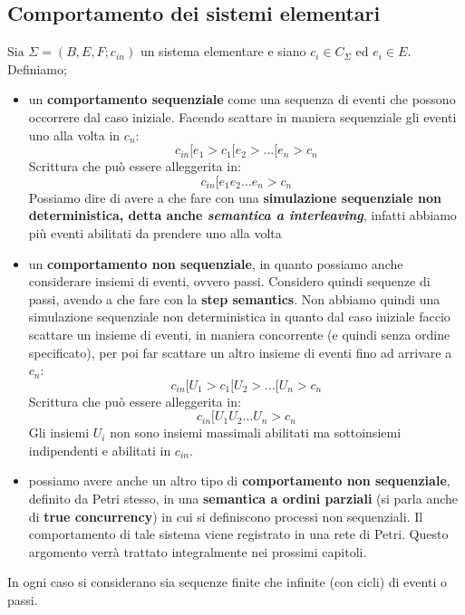 \subsection{Comportamento dei sistemi elementari}
\begin{definizione}
  Sia $\Sigma=(B, E, F;c_{in})$ un sistema elementare e siano $c_i\in C_\Sigma$ ed
  $e_i\in E$.\\
  Definiamo;
  \begin{itemize}
    \item un \textbf{comportamento sequenziale} come una sequenza di eventi che
    possono occorrere dal caso iniziale. Facendo scattare in maniera sequenziale
    gli eventi uno alla volta in $c_n$:
    \[c_{in} [e_1 > c_1 [e_2 > \ldots[e_n > c_n\]
    Scrittura che può essere alleggerita in:
    \[c_{in} [e_1 e_2 \ldots e_n > c_n\]
    Possiamo dire di avere a che fare con una \textbf{simulazione sequenziale
      non deterministica, detta anche \textit{semantica a interleaving}},
    infatti abbiamo più eventi abilitati da prendere uno alla volta
    \item un \textbf{comportamento non sequenziale}, in quanto possiamo anche
    considerare insiemi di eventi, ovvero passi. Considero quindi sequenze di
    passi, avendo a che fare con la \textbf{step semantics}. Non abbiamo quindi una
    simulazione sequenziale non deterministica in quanto dal caso iniziale
    faccio scattare un insieme di eventi, in maniera concorrente (e quindi senza
    ordine specificato), per poi far scattare un altro insieme di eventi fino ad
    arrivare a $c_n$: 
    \[c_{in} [U_1 > c_1 [U_2 > \ldots [U_n > c_n\]
    Scrittura che può essere alleggerita in:
    \[c_{in} [U_1 U_2 \ldots U_n > c_n\]
    Gli insiemi $U_i$ non sono insiemi massimali abilitati ma sottoinsiemi
    indipendenti e abilitati in $c_{in}$.\\
\item    possiamo avere anche un altro tipo di \textbf{comportamento non sequenziale},
    definito da Petri stesso, in una \textbf{semantica a ordini parziali} (si
    parla anche di \textbf{true concurrency}) in
    cui si definiscono processi non sequenziali. Il comportamento di tale
    sistema viene registrato in una rete di Petri. Questo argomento verrà trattato integralmente nei prossimi capitoli.
  \end{itemize}
  In ogni caso si considerano sia sequenze finite che infinite (con cicli) di
  eventi o passi. 
\end{definizione} \vspace{5mm} %
